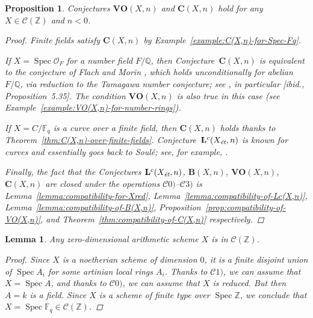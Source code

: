 \documentclass[10pt,a4paper,oneside,draft]{article}
\DeclareMathOperator{\Spec}{Spec}
\newcommand{\FF}{\mathbb{F}}
\newcommand{\QQ}{\mathbb{Q}}
\newcommand{\ZZ}{\mathbb{Z}}
\newcommand{\et}{\text{\it \'{e}t}}
\theoremstyle{myplain}
\newtheorem{proposition}[theorem]{Proposition}
\newtheorem{lemma}[theorem]{Lemma}
\theoremstyle{mydefinition}
\numberwithin{equation}{section}
\begin{document}
\begin{proposition}
  \label{prop:C(X,n)-holds-for-C(Z)}
  Conjectures $\mathbf{VO} (X,n)$ and $\mathbf{C} (X,n)$ hold for any
  $X \in \mathcal{C} (\ZZ)$ and $n < 0$.

  \begin{proof}
    Finite fields satisfy $\mathbf{C} (X,n)$ by
    Example~\ref{example:C(X,n)-for-Spec-Fq}.

    If $X = \Spec \mathcal{O}_F$ for a number field $F/\QQ$, then
    Conjecture~$\mathbf{C} (X,n)$ is equivalent to the conjecture of Flach and
    Morin \cite[Conjecture~5.12]{Flach-Morin-2018}, which holds unconditionally
    for abelian $F/\QQ$, via reduction to the Tamagawa number conjecture; see
    \cite[\S 5.8.3]{Flach-Morin-2018}, in particular
    [ibid., Proposition~5.35]. The condition $\mathbf{VO} (X,n)$ is also true in
    this case (see Example~\ref{example:VO(X,n)-for-number-rings}).

    If $X = C/\FF_q$ is a curve over a finite field, then $\mathbf{C} (X,n)$
    holds thanks to
    Theorem~\ref{thm:C(X,n)-over-finite-fields}.
    Conjecture~$\mathbf{L}^c (X_\et,n)$ is known for curves and essentially goes
    back to Soul\'{e}; see, for example, \cite[Proposition~4.3]{Geisser-2017}.

    Finally, the fact that the Conjectures $\mathbf{L}^c (X_\et,n)$,
    $\mathbf{B} (X,n)$, $\mathbf{VO} (X,n)$, $\mathbf{C} (X,n)$ are closed under
    the operations $\mathcal{C}0)$--$\mathcal{C}3)$ is
    Lemma~\ref{lemma:compatibility-for-Xred},
    Lemma~\ref{lemma:compatibility-of-Lc(X,n)},
    Lemma~\ref{lemma:compatibility-of-B(X,n)},
    Proposition~\ref{prop:compatibility-of-VO(X,n)}, and
    Theorem~\ref{thm:compatibility-of-C(X,n)} respectively.
  \end{proof}
\end{proposition}

\begin{lemma}
  Any zero-dimensional arithmetic scheme $X$ is in $\mathcal{C} (\ZZ)$.

  \begin{proof}
    Since $X$ is a noetherian scheme of dimension $0$, it is a finite disjoint
    union of $\Spec A_i$ for some artinian local rings $A_i$. Thanks to
    $\mathcal{C}1)$, we can assume that $X = \Spec A$, and thanks to
    $\mathcal{C}0)$, we can assume that $X$ is reduced. But then $A = k$ is a
    field. Since $X$ is a scheme of finite type over $\Spec \ZZ$, we conclude
    that $X = \Spec \FF_q \in \mathcal{C} (\ZZ)$.
  \end{proof}
\end{lemma}
\end{document}
